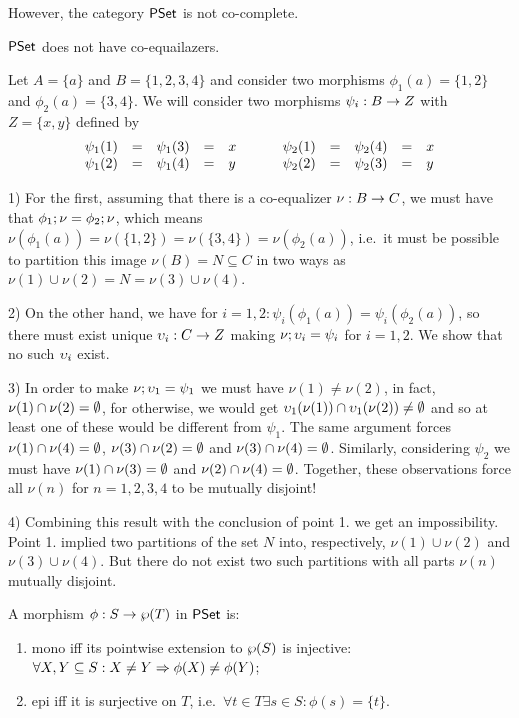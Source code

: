 \documentclass[10pt]{article}
\begin{document}
\noindent
However, the category $\mbox{\rm\sf PSet}$ is not co-complete.

\begin{Lemma}
\label{le:PSnocoeq}
$\mbox{\rm\sf PSet}$ does not have co-equailazers.
\end{Lemma}

\begin{Proof}
Let $A=\{a\}$ and $B=\{1,2,3,4\}$ and consider two morphisms
$\phi_1(a)=\{1,2\}$ and $\phi_2(a)=\{3,4\}$. We will consider two
morphisms $\psi_i:B\rightarrow Z$ with $Z=\{x,y\}$ defined by
\[
\begin{array}{rcccl@{\ \ \ \ \ \ \ \ \ \ }rcccl}
\psi_1(1) & = & \psi_1(3) & =& x &  \psi_2(1) & = & \psi_2(4) & = & x \\
\psi_1(2) & = & \psi_1(4) & =& y &   \psi_2(2) & = &\psi_2(3) & = & y \\
\end{array} 
\]

1) For the first, assuming that there is a co-equalizer $\nu:B\rightarrow
C$, we must have that $\phi_1;\nu=\phi_2;\nu$, which means
$\nu(\phi_1(a))=\nu(\{1,2\})=\nu(\{3,4\})=\nu(\phi_2(a))$, i.e.\ it
must be possible to partition this image $\nu(B)=N\subseteq C$ in two
ways as $\nu(1)\cup\nu(2)=N=\nu(3)\cup\nu(4)$.

2) On the other hand, we have for $i=1,2:
\psi_i(\phi_1(a))=\psi_i(\phi_2(a))$, so there must exist unique
$\upsilon_i:C\rightarrow Z$ making $\nu;\upsilon_i=\psi_i$ for $i=1,2$. We
show that no such $\upsilon_i$ exist.

3) In order to make $\nu;\upsilon_1=\psi_1$ we must have
$\nu(1)\not=\nu(2)$, in fact, $\nu(1)\cap\nu(2)=\emptyset$, for otherwise,
we would get $\upsilon_1(\nu(1))\cap\upsilon_1(\nu(2))\not=\emptyset$ and so at
least one of these would be different from $\psi_1$. The same argument
forces $\nu(1)\cap\nu(4)=\emptyset$, $\nu(3)\cap\nu(2)=\emptyset$ and
$\nu(3)\cap\nu(4)=\emptyset$.  Similarly, considering $\psi_2$ we must have
$\nu(1)\cap\nu(3)=\emptyset$ and $\nu(2)\cap\nu(4)=\emptyset$.  Together, these
observations force all $\nu(n)$ for $n=1,2,3,4$ to be mutually
disjoint!

4) Combining this result with the conclusion of point 1. we get an
impossibility. Point 1. implied two partitions of the set $N$ into,
respectively, $\nu(1)\cup \nu(2)$ and $\nu(3)\cup\nu(4)$. But there do
not exist two such partitions with all parts $\nu(n)$ mutually
disjoint.
\end{Proof}

\begin{Lemma}
\label{le:charepimono}
A morphism $\phi:S\rightarrow \wp(T)$ in $\mbox{\rm\sf PSet}$ is:

\begin{enumerate}\MyLPar
\item 
mono iff its pointwise extension to $\wp(S)$ is injective:
$\forall X,Y\subseteq S: X\not=Y \Rightarrow \phi(X)\not=\phi(Y)$;
\item 
epi iff it is surjective on $T$, i.e.\ $\forall t\in T \exists s\in S:
\phi(s)=\{t\}$.
\end{enumerate}

\end{Lemma}
\end{document}
